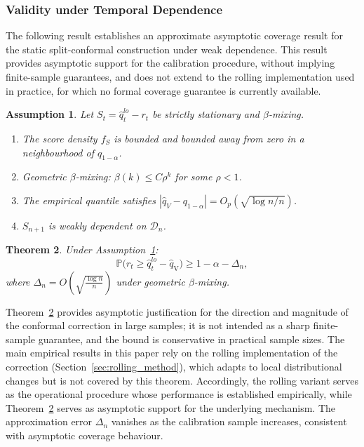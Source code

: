\documentclass[preprint,11pt,authoryear]{elsarticle}
\newtheorem{theorem}{Theorem}[section]
\newtheorem{assumption}[theorem]{Assumption}
\newcommand{\1}{\boldsymbol{1}}
\newcommand{\qV}{\hat{q}_{\scriptscriptstyle\mathrm{V}}}
\begin{document}
	\subsubsection{Validity under Temporal Dependence}
	\label{sec:validity}
	
	The following result establishes an approximate asymptotic coverage result for the static split-conformal construction under
	weak dependence. This result provides asymptotic support for the calibration procedure, without implying finite-sample guarantees, and does not extend to the rolling implementation used in practice, for which no formal coverage guarantee is currently available.

	\begin{assumption}\label{ass:main}
		Let $S_t = \hat{q}^{lo}_t - r_t$ be strictly stationary and $\beta$-mixing.
		\begin{enumerate}[label=\textup{(A\arabic*)}]
			\item\label{ass:density} The score density $f_S$ is bounded and bounded away from zero in a neighbourhood of $q_{1-\alpha}$.
			\item\label{ass:mixing} Geometric $\beta$-mixing: $\beta(k) \leq C\rho^k$ for some $\rho < 1$.
			\item\label{ass:quantile} The empirical quantile satisfies $|\hat{q}_V - q_{1-\alpha}| = O_p(\sqrt{\log n / n})$.
			\item\label{ass:weak_dep} $S_{n+1}$ is weakly dependent on $\mathcal{D}_n$.
		\end{enumerate}
	\end{assumption}

	\begin{theorem}
		\label{thm:dependent_conformal_var}
		Under Assumption~\ref{ass:main}:
		\[
		\mathbb{P}\big(r_{t} \geq \hat{q}_t^{lo} - \qV\big)
		\ge 1 - \alpha - \Delta_n,
		\]
		where $\Delta_n = O\!\left(\sqrt{\frac{\log n}{n}}\right)$
		under geometric $\beta$-mixing.
	\end{theorem}
	
	Theorem~\ref{thm:dependent_conformal_var} provides asymptotic justification for the direction and magnitude of the conformal correction in large samples; it is not intended as a sharp finite-sample guarantee, and the bound is conservative in practical sample sizes. The main empirical results in this paper rely on the rolling implementation of the correction (Section~\ref{sec:rolling_method}), which adapts to local distributional changes but is not covered by this theorem. Accordingly, the rolling variant serves as the operational procedure whose performance is established empirically, while Theorem~\ref{thm:dependent_conformal_var} serves as asymptotic support for the underlying mechanism. The approximation error $\Delta_n$ vanishes as the calibration sample increases, consistent with asymptotic coverage behaviour.
	
\end{document}
